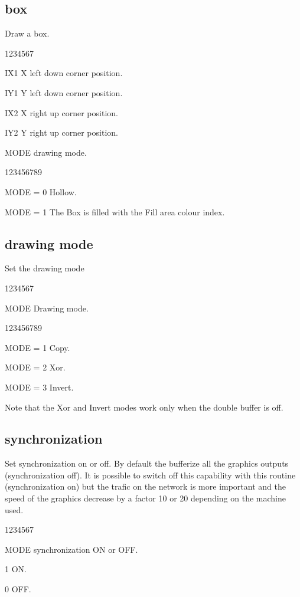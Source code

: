 \subsection{ box}
%
\Action
Draw a box.
\Pdesc
\begin{DLtt}{1234567}
\item[IX1] X left down corner position.
\item[IY1] Y left down corner position.
\item[IX2] X right up corner position.
\item[IY2] Y right up corner position.
\item[MODE] drawing mode.
\begin{DLtt}{123456789}
\item[MODE = 0 ] Hollow.
\item[MODE = 1 ] The Box is filled with the Fill area colour index.
\end{DLtt}
\end{DLtt}
\subsection{ drawing mode}
%
\Action
Set the drawing mode
\Pdesc
\begin{DLtt}{1234567}
\item[MODE] Drawing mode.
\begin{DLtt}{123456789}
\item[MODE = 1 ] Copy.
\item[MODE = 2 ] Xor.
\item[MODE = 3 ] Invert.
\end{DLtt}
\end{DLtt}
Note that the Xor and Invert modes work only when the
double buffer is off.
\subsection{ synchronization}
%
\Action
Set synchronization on or off. By default the \XW{} bufferize all the
graphics outputs (synchronization off). It is possible to switch off this
capability with this routine (synchronization on) but the trafic
on the network is more important and the speed of the graphics decrease
by a factor 10 or 20 depending on the machine used.
\Pdesc
\begin{DLtt}{1234567}
\item[MODE] synchronization ON or OFF.
\begin{DLtt}{12}
\item[1] ON.
\item[0] OFF.
\end{DLtt}
\end{DLtt}

